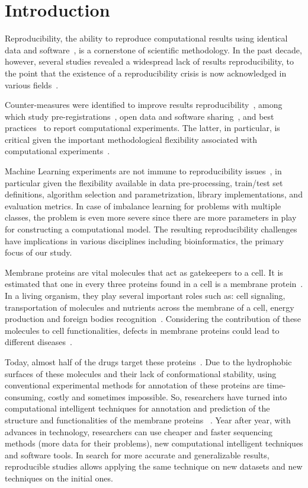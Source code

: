 \chapter{Introduction}
Reproducibility, the ability to reproduce computational results using identical data 
and software~\cite{peng2011reproducible}, is a cornerstone of scientific methodology. 
In the past decade, however, several studies revealed a widespread lack of results 
reproducibility, to the point that the existence of a reproducibility crisis is 
now acknowledged in various fields~\cite{baker_1500_2016}.

Counter-measures were identified to improve results reproducibility~\cite{sandve2013ten}, 
among which study pre-registrations~\cite{chambers2015registered}, open data and software
sharing~\cite{wilkinson2016fair}, and best practices~\cite{nichols2017best} to report 
computational experiments. The latter, in particular, is critical given the important 
methodological flexibility associated with computational experiments~\cite{carp2012plurality}.

Machine Learning experiments are not immune to reproducibility
issues~\cite{raff2019step}, in particular given the flexibility available in
data pre-processing, train/test set definitions, algorithm selection and
parametrization, library implementations, and evaluation metrics. 
In case of imbalance learning for problems with multiple classes, 
the problem is even more severe since there are more parameters in play for constructing 
a computational model. The resulting reproducibility challenges have implications in various
disciplines including bioinformatics, the primary focus of our study.


Membrane proteins are vital molecules that act as gatekeepers to a cell. 
It is estimated that one in every three proteins found in a cell is a membrane 
protein~\cite{cell2016Membranes}.  In a living organism, they play several important roles such as: 
cell signaling,  transportation of  molecules and nutrients across the membrane of a cell, 
energy production and foreign bodies recognition~\cite{kozma2012pdbtm}. Considering the contribution of 
these molecules to cell functionalities, defects in membrane proteins could lead to 
different diseases~\cite{gromiha2014bioinformatics}. 

Today, almost half of the drugs target these proteins~\cite{butt2017treatise}. 
Due to the hydrophobic surfaces of these molecules and their lack of conformational stability, 
using conventional experimental methods for annotation of these proteins are time-consuming, 
costly and sometimes impossible. So, researchers have turned into computational 
intelligent techniques for annotation and prediction of the structure and functionalities of the membrane proteins
~\cite{gromiha2006discrimination,gromiha2008functional,ou2010classification,schaadt2012functional,butt2016prediction}. 
Year after year, with advances in technology, researchers can use cheaper and 
faster sequencing methods (more data for their problems), new computational intelligent 
techniques and software tools. In search for more accurate and generalizable results, 
reproducible studies allows applying the same technique on new datasets and new techniques 
on the initial ones.

